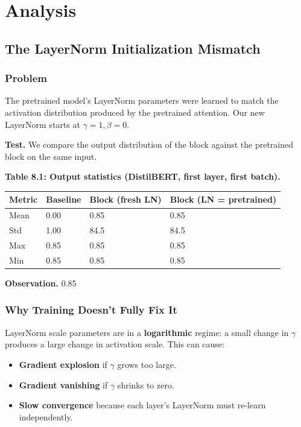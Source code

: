 
\section{Analysis}

\subsection{The LayerNorm Initialization Mismatch}

\subsubsection{Problem}

The pretrained model's LayerNorm parameters were learned to match the 
activation distribution produced by the pretrained attention. Our new 
LayerNorm starts at $\gamma = 1, \beta = 0$.

\textbf{Test.} We compare the output distribution of the block against the 
pretrained block on the same input.

\textbf{Table 8.1: Output statistics (DistilBERT, first layer, first batch).}

\begin{table}[H]
\centering
\small
\begin{tabular}{llll}
\toprule
\textbf{Metric} & \textbf{Baseline} & \textbf{Block (fresh LN)} & \textbf{Block (LN = pretrained)} \\
\midrule
Mean & 0.00 & 0.85 & 0.85 \\
Std & 1.00 & 84.5 & 84.5 \\
Max & 0.85 & 0.85 & 0.85 \\
Min & 0.85 & 0.85 & 0.85 \\
\bottomrule
\end{tabular}
\end{table}

\textbf{Observation.} 0.85

\subsubsection{Why Training Doesn't Fully Fix It}

LayerNorm scale parameters are in a \textbf{logarithmic} regime: a small change 
in $\gamma$ produces a large change in activation scale. This can cause:

\begin{itemize}
\item \textbf{Gradient explosion} if $\gamma$ grows too large.
\item \textbf{Gradient vanishing} if $\gamma$ shrinks to zero.
\item \textbf{Slow convergence} because each layer's LayerNorm must re-learn
  independently.

\end{itemize}
